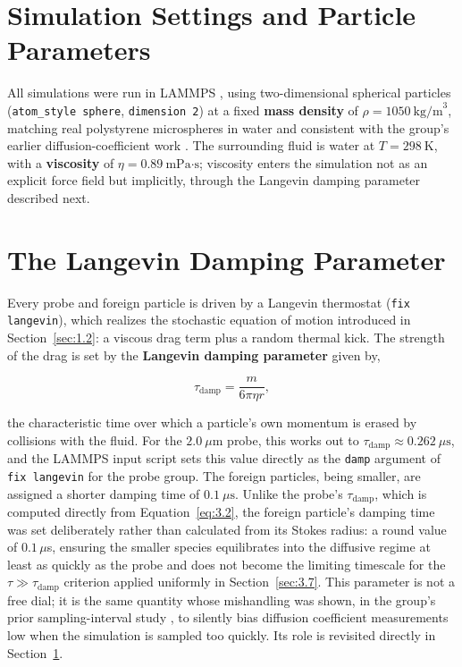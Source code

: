 \section{Simulation Settings and Particle Parameters}
\label{section:3.4}
All simulations were run in LAMMPS \cite{Thompson2022}, using two-dimensional spherical particles (\texttt{atom\_style sphere}, \texttt{dimension 2}) at a fixed \textbf{mass density} of $\rho = 1050~\text{kg/m}^3$, matching real polystyrene microspheres in water and consistent with the group's earlier
diffusion-coefficient work \cite{Cusi2018, balejado2025}. The surrounding fluid is water at $T = 298~\text{K}$, with a \textbf{viscosity} of $\eta = 0.89~\text{mPa·s}$; viscosity enters the simulation not as an explicit force field but implicitly, through the Langevin damping parameter described next.

\section{The Langevin Damping Parameter}
\label{sec:3.5}
Every probe and foreign particle is driven by a Langevin thermostat (\texttt{fix langevin}), which realizes the stochastic equation of motion introduced in Section~\ref{sec:1.2}: a viscous drag term plus a random thermal kick. The strength of the drag is set by the \textbf{Langevin damping parameter} given by,

\begin{equation}
  \tau_\text{damp} = \frac{m}{6 \pi \eta r},
  \label{eq:3.2}
\end{equation}

the characteristic time over which a particle's own momentum is erased by collisions with the fluid. For the $2.0~\mu\text{m}$ probe, this works out to $\tau_\text{damp} \approx 0.262~\mu\text{s}$, and the LAMMPS input script sets this value directly as the \texttt{damp} argument of \texttt{fix langevin} for the probe group. The foreign particles, being smaller, are assigned a shorter damping time of $0.1~\mu\text{s}$. Unlike the probe's $\tau_\text{damp}$, which is computed directly from Equation~\ref{eq:3.2}, the foreign particle's damping time was set deliberately rather than calculated from its Stokes radius: a round value of $0.1\,\mu$s, ensuring the smaller species equilibrates into the diffusive regime at least as quickly as the probe and does not become the limiting timescale for the $\tau \gg \tau_\text{damp}$ criterion applied uniformly in Section~\ref{sec:3.7}. This parameter is not a free dial; it is the same quantity whose mishandling was shown, in the group's prior sampling-interval study \cite{balejado2025}, to silently bias diffusion coefficient measurements low when the simulation is sampled too quickly. Its role is revisited directly in Section~\ref{section:3.4}.

